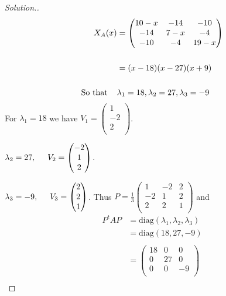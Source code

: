 \documentclass[11pt,a4paper]{article}
\theoremstyle{definition}
\newenvironment{solution}
  {\renewcommand{\qedsymbol}{}\begin{proof}[\textit{Solution}.]}
  {\end{proof}}
\begin{document}
\begin{solution}
\begin{align*}
X_A(x) &=
\begin{pmatrix}
10-x&-14&-10\\-14&7-x&-4\\-10&-4&19-x\\
\end{pmatrix}\\\\
&=(x-18)(x-27)(x+9)\\\\
\text{So that}\hspace{0.4cm}& \lambda_1=18, \lambda_2=27, \lambda_3=-9\\
\end{align*}
For $\lambda_1=18$ we have $
V_1=
\begin{pmatrix}
1\\-2\\2\\
\end{pmatrix}
$.

$\lambda_2=27,\hspace{0.5cm} V_2=
\begin{pmatrix}
-2\\1\\2\\
\end{pmatrix}
$.

$\lambda_3=-9,\hspace{0.5cm} V_3=
\begin{pmatrix}
2\\2\\1\\
\end{pmatrix}
$. Thus $P=\frac{1}{3}
\begin{pmatrix}
1&-2&2\\-2&1&2\\2&2&1\\
\end{pmatrix}
$ and 
\begin{align*}
P^tAP &=\text{diag}(\lambda_1,\lambda_2,\lambda_3)\\
      &=\text{diag}(18,27,-9)\\\\
      &=
\begin{pmatrix}
18&0&0\\0&27&0\\0&0&-9\\
\end{pmatrix}\\
\end{align*}


\end{solution}
\end{document}
